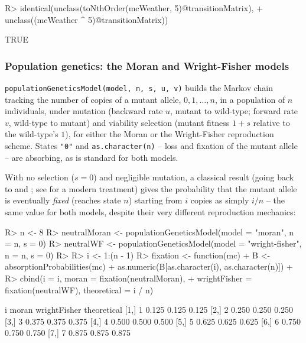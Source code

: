 \documentclass[
  nojss]{jss}
\begin{document}
\begin{CodeChunk}
\begin{CodeInput}
R> identical(unclass(toNthOrder(mcWeather, 5)@transitionMatrix),
+           unclass((mcWeather ^ 5)@transitionMatrix))
\end{CodeInput}
\begin{CodeOutput}
[1] TRUE
\end{CodeOutput}
\end{CodeChunk}

\subsubsection{Population genetics: the Moran and Wright-Fisher models}\label{population-genetics-the-moran-and-wright-fisher-models}

\texttt{populationGeneticsModel(model,\ n,\ s,\ u,\ v)} builds the Markov chain
tracking the number of copies of a mutant allele, \(0,1,\ldots,n\), in a
population of \(n\) individuals, under mutation (backward rate \(u\), mutant
to wild-type; forward rate \(v\), wild-type to mutant) and viability
selection (mutant fitness \(1+s\) relative to the wild-type's \(1\)), for
either the Moran or the Wright-Fisher reproduction scheme. States \texttt{"0"}
and \texttt{as.character(n)} -- loss and fixation of the mutant allele -- are
absorbing, as is standard for both models.

With no selection (\(s=0\)) and negligible mutation, a classical result
(going back to \citealp{wright1931} and \citealp{moran1958}; see
\citealp{ewens2004} for a modern treatment) gives the probability that the
mutant allele is eventually \emph{fixed} (reaches state \(n\)) starting from \(i\)
copies as simply \(i/n\) -- the same value for both models, despite their
very different reproduction mechanics:

\begin{CodeChunk}
\begin{CodeInput}
R> n <- 8
R> neutralMoran <- populationGeneticsModel(model = "moran", n = n, s = 0)
R> neutralWF <- populationGeneticsModel(model = "wright-fisher", n = n, s = 0)
R> 
R> i <- 1:(n - 1)
R> fixation <- function(mc) {
+   B <- absorptionProbabilities(mc)
+   as.numeric(B[as.character(i), as.character(n)])
+ }
R> cbind(i = i, moran = fixation(neutralMoran),
+       wrightFisher = fixation(neutralWF), theoretical = i / n)
\end{CodeInput}
\begin{CodeOutput}
     i moran wrightFisher theoretical
[1,] 1 0.125        0.125       0.125
[2,] 2 0.250        0.250       0.250
[3,] 3 0.375        0.375       0.375
[4,] 4 0.500        0.500       0.500
[5,] 5 0.625        0.625       0.625
[6,] 6 0.750        0.750       0.750
[7,] 7 0.875        0.875       0.875
\end{CodeOutput}
\end{CodeChunk}
\end{document}
